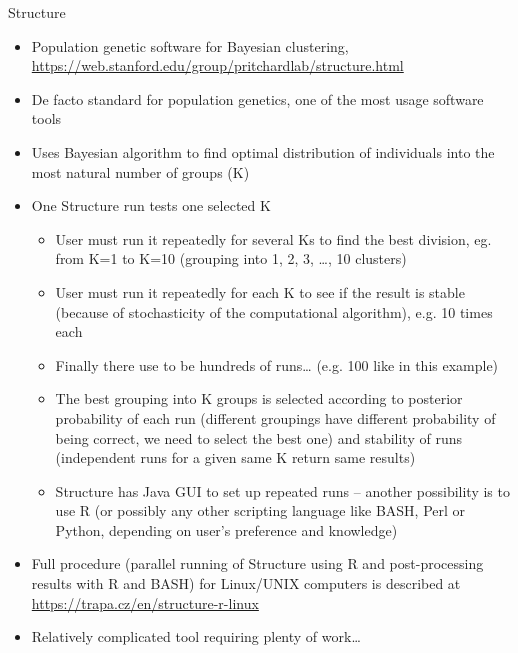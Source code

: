 \documentclass[compress, ucs, xelatex, 11pt, xcolor=svgnames,
  hyperref={
    bookmarks=true,
    unicode=true,
    colorlinks=true,
    pdftitle={Molecular data in R},
    plainpages=false,
    pdfauthor={Vojtech Zeisek},
    pdfsubject={Course about phylogeny and evolution in R},
    pdfcreator={XeLaTeX},
    pdfkeywords={R, evolution, phylogeny, molecular data},
    linkcolor=Tomato,
    anchorcolor=SaddleBrown,
    citecolor=Goldenrod,
    filecolor=DarkMagenta,
    menucolor=Sienna,
    urlcolor=DarkTurquoise,
    pdftex},
  url={hyphens, lowtilde} %
  ]{beamer}
\begin{document}
\begin{frame}[allowframebreaks]{Structure}
  \label{structure}
  \begin{itemize}
    \item Population genetic software for Bayesian clustering, \url{https://web.stanford.edu/group/pritchardlab/structure.html}
    \item De facto standard for population genetics, one of the most usage software tools
    \item Uses Bayesian algorithm to find optimal distribution of individuals into the most natural number of groups (K)
    \item One Structure run tests one selected K
    \begin{itemize}
      \item User must run it repeatedly for several Ks to find the best division, eg. from K=1 to K=10 (grouping into 1, 2, 3, \ldots, 10 clusters)
      \item User must run it repeatedly for each K to see if the result is stable (because of stochasticity of the computational algorithm), e.g. 10 times each
      \item Finally there use to be hundreds of runs\ldots{ } (e.g. 100 like in this example)
      \item The best grouping into K groups is selected according to posterior probability of each run (different groupings have different probability of being correct, we need to select the best one) and stability of runs (independent runs for a given same K return same results)
      \item Structure has Java GUI to set up repeated runs -- another possibility is to use R (or possibly any other scripting language like BASH, Perl or Python, depending on user's preference and knowledge)
    \end{itemize}
    \item Full procedure (parallel running of Structure using R and post-processing results with R and BASH) for Linux/UNIX computers is described at \url{https://trapa.cz/en/structure-r-linux}
    \item Relatively complicated tool requiring plenty of work\ldots
  \end{itemize}
\end{frame}
\end{document}
